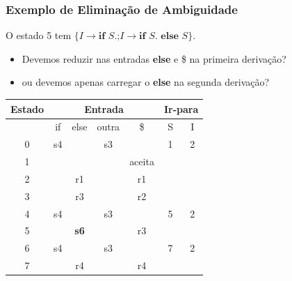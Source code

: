 \documentclass[table]{beamer}
\begin{document}
\begin{frame}
   \frametitle{Exemplo de Eliminação de Ambiguidade}
   O estado 5 tem $\{I\to\textbf{if }S.\text{;}I\to\textbf{if }S.\textbf{ else }S\}$.
   \begin{itemize}
      \item Devemos reduzir nas entradas \textbf{else} e \$ na primeira derivação?
      \item ou devemos  apenas carregar o \textbf{else} na segunda derivação?
   \end{itemize}
   \begin{table}
      \begin{tabular}{|c|c|c|c|c|c|c|}
      \hline
      \textbf{Estado} & \multicolumn{4}{c|}{\textbf{Entrada}} & \multicolumn{2}{c|}{\textbf{Ir-para}} \\
      \hline 
       & if & else & outra & \$ & S & I \\
       \hline
       0 & s4 &    & s3 &        & 1 & 2 \\
       1 &    &    &    & aceita &   &   \\
       2 &    & r1 &    & r1     &   &   \\
       3 &    & r3 &    & r2     &   &   \\
       4 & s4 &    & s3 &        & 5 & 2 \\
       5 &    & \textbf{s6} &    & r3     &   &   \\
       6 & s4 &    & s3 &        & 7 & 2 \\
       7 &    & r4 &    & r4     &   &   \\
      \hline
      \end{tabular}
   \end{table}
\end{frame}
\end{document}
